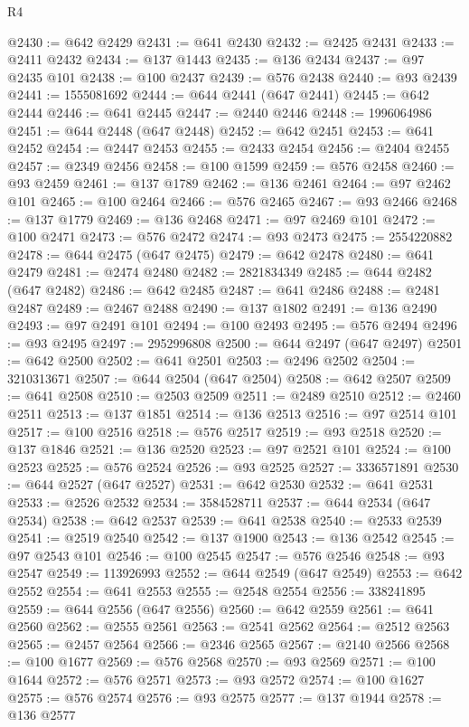 \begin{lexlean}{R4}
\begin{coremodule}
@2430 := @642 @2429
@2431 := @641 @2430
@2432 := @2425 @2431
@2433 := @2411 @2432
@2434 := @137 @1443
@2435 := @136 @2434
@2437 := @97 @2435 @101
@2438 := @100 @2437
@2439 := @576 @2438
@2440 := @93 @2439
@2441 := 1555081692
@2444 := @644 @2441 (@647 @2441)
@2445 := @642 @2444
@2446 := @641 @2445
@2447 := @2440 @2446
@2448 := 1996064986
@2451 := @644 @2448 (@647 @2448)
@2452 := @642 @2451
@2453 := @641 @2452
@2454 := @2447 @2453
@2455 := @2433 @2454
@2456 := @2404 @2455
@2457 := @2349 @2456
@2458 := @100 @1599
@2459 := @576 @2458
@2460 := @93 @2459
@2461 := @137 @1789
@2462 := @136 @2461
@2464 := @97 @2462 @101
@2465 := @100 @2464
@2466 := @576 @2465
@2467 := @93 @2466
@2468 := @137 @1779
@2469 := @136 @2468
@2471 := @97 @2469 @101
@2472 := @100 @2471
@2473 := @576 @2472
@2474 := @93 @2473
@2475 := 2554220882
@2478 := @644 @2475 (@647 @2475)
@2479 := @642 @2478
@2480 := @641 @2479
@2481 := @2474 @2480
@2482 := 2821834349
@2485 := @644 @2482 (@647 @2482)
@2486 := @642 @2485
@2487 := @641 @2486
@2488 := @2481 @2487
@2489 := @2467 @2488
@2490 := @137 @1802
@2491 := @136 @2490
@2493 := @97 @2491 @101
@2494 := @100 @2493
@2495 := @576 @2494
@2496 := @93 @2495
@2497 := 2952996808
@2500 := @644 @2497 (@647 @2497)
@2501 := @642 @2500
@2502 := @641 @2501
@2503 := @2496 @2502
@2504 := 3210313671
@2507 := @644 @2504 (@647 @2504)
@2508 := @642 @2507
@2509 := @641 @2508
@2510 := @2503 @2509
@2511 := @2489 @2510
@2512 := @2460 @2511
@2513 := @137 @1851
@2514 := @136 @2513
@2516 := @97 @2514 @101
@2517 := @100 @2516
@2518 := @576 @2517
@2519 := @93 @2518
@2520 := @137 @1846
@2521 := @136 @2520
@2523 := @97 @2521 @101
@2524 := @100 @2523
@2525 := @576 @2524
@2526 := @93 @2525
@2527 := 3336571891
@2530 := @644 @2527 (@647 @2527)
@2531 := @642 @2530
@2532 := @641 @2531
@2533 := @2526 @2532
@2534 := 3584528711
@2537 := @644 @2534 (@647 @2534)
@2538 := @642 @2537
@2539 := @641 @2538
@2540 := @2533 @2539
@2541 := @2519 @2540
@2542 := @137 @1900
@2543 := @136 @2542
@2545 := @97 @2543 @101
@2546 := @100 @2545
@2547 := @576 @2546
@2548 := @93 @2547
@2549 := 113926993
@2552 := @644 @2549 (@647 @2549)
@2553 := @642 @2552
@2554 := @641 @2553
@2555 := @2548 @2554
@2556 := 338241895
@2559 := @644 @2556 (@647 @2556)
@2560 := @642 @2559
@2561 := @641 @2560
@2562 := @2555 @2561
@2563 := @2541 @2562
@2564 := @2512 @2563
@2565 := @2457 @2564
@2566 := @2346 @2565
@2567 := @2140 @2566
@2568 := @100 @1677
@2569 := @576 @2568
@2570 := @93 @2569
@2571 := @100 @1644
@2572 := @576 @2571
@2573 := @93 @2572
@2574 := @100 @1627
@2575 := @576 @2574
@2576 := @93 @2575
@2577 := @137 @1944
@2578 := @136 @2577

\end{coremodule}
\end{lexlean}
